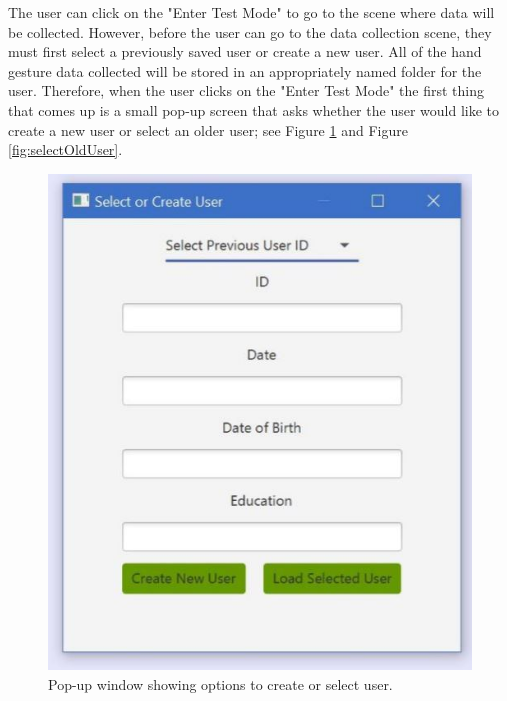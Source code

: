 The user can click on the "Enter Test Mode" to go to the scene where data will be collected. However, before the user can go to the data collection scene, they must first select a previously saved user or create a new user. All of the hand gesture data collected will be stored in an appropriately named folder for the user. Therefore, when the user clicks on the "Enter Test Mode" the first thing that comes up is a small pop-up screen that asks whether the user would like to create a new user or select an older user; see Figure \ref{fig:createNewUser} and Figure \ref{fig:selectOldUser}. 
\begin{figure}[H]
    \centering
    \begin{minipage}{0.45\textwidth}
        \centering
        \includegraphics[scale=.45]{Figures/6_selectUser.JPG} 
        \caption{Pop-up window showing options to create or select user. }
		\label{fig:createNewUser}
    \end{minipage}\hfill
    \begin{minipage}{0.45\textwidth}
        \centering

\end{minipage}
\end{figure}
